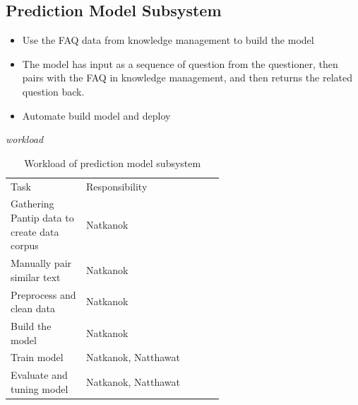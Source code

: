 \documentclass[12pt,oneside,openright,a4paper]{cpe-english-project}
\begin{document}
	\subsection{Prediction Model Subsystem}
	\begin{itemize}
		\item Use the FAQ data from knowledge management to build the model
		\item The model has input as a sequence of question from the questioner, then pairs with the FAQ in knowledge management, and then returns the related question back.
		\item Automate build model and deploy
	\end{itemize}
\emph{workload}
\begin{table}[h]
	\centering
	\caption{Workload of prediction model subsystem}
	\label{tab:Workload of prediction model subsystem}
\begin{adjustbox}{width=\textwidth}
\begin{tabular}{lp{0.6\linewidth}l}
		\rowcolor[HTML]{5B9BD5} 
		Task                                        & Responsibility      \\
		\rowcolor[HTML]{DEEAF6} 
		Gathering Pantip data to create data corpus & Natkanok            \\
		Manually pair similar text                  & Natkanok            \\
		\rowcolor[HTML]{DEEAF6} 
		Preprocess and clean data                   & Natkanok            \\
		Build the model                             & Natkanok            \\
		\rowcolor[HTML]{DEEAF6} 
		Train model                                 & Natkanok, Natthawat \\
		Evaluate and tuning model                   & Natkanok, Natthawat 
	\end{tabular}
\end{adjustbox}
\end{table}
\end{document}
